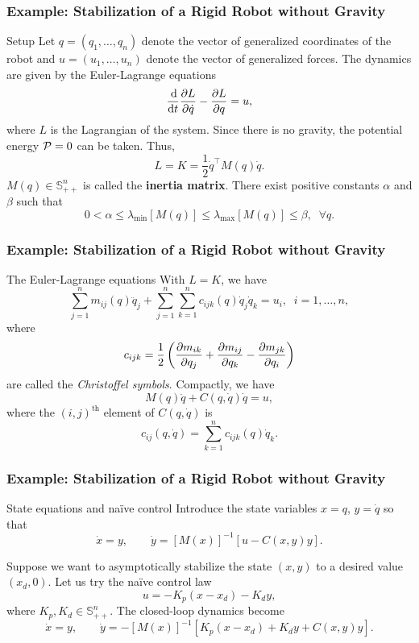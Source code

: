\begin{frame}
    \frametitle{Example: Stabilization of a Rigid Robot without Gravity}

    \begin{block}{Setup}
        Let $q = (q_1, \ldots, q_n)$ denote the vector of generalized
        coordinates of the robot and $u = (u_1, \ldots, u_n)$ denote the vector
        of generalized forces. The dynamics are given by the Euler-Lagrange
        equations \[ \frac{\operatorname{d}\!}{\operatorname{d}\! t} \frac{\partial L}{\partial \dot{q}} - \frac{\partial L}{\partial q} = u, \] where
        $L$ is the Lagrangian of the system. Since there is no gravity, the
        potential energy $\mathcal{P} = 0$ can be taken. Thus, \[ L = K =
        \frac{1}{2}\dot{q}^\top M(q) \dot{q}. \] $M(q) \in \mathbb{S}_{++}^n$ is
        called the \textbf{inertia matrix}. There exist positive constants
        $\alpha$ and $\beta$ such that \[ 0 < \alpha \leq
        \lambda_{\text{min}}\left[M(q)\right] \leq
        \lambda_{\text{max}}\left[M(q)\right] \leq \beta, \;\; \forall q. \]
    \end{block}
\end{frame}

\begin{frame}
    \frametitle{Example: Stabilization of a Rigid Robot without Gravity}

    \begin{block}{The Euler-Lagrange equations}
         With $L=K$, we have \[ \sum_{j=1}^n m_{ij}(q)\ddot{q}_j + \sum_{j=1}^n
         \sum_{k=1}^n c_{ijk}(q) \dot{q}_j \dot{q}_k = u_i, \;\; i = 1, \ldots,
         n, \] where \[ c_{ijk} = \frac{1}{2} \left( \frac{\partial m_{ik}}{\partial q_j} +
         \frac{\partial m_{ij}}{\partial q_k} - \frac{\partial m_{jk}}{\partial q_i} \right) \] are called the
         \textit{Christoffel symbols}. Compactly, we have \[ M(q) \ddot{q} +
         C(q,\dot{q})\dot{q} = u, \] where the $(i,j)^{\text{th}}$ element of
         $C(q,\dot{q})$ is \[ c_{ij}(q,\dot{q}) = \sum_{k=1}^n
         c_{ijk}(q)\dot{q}_k. \]
    \end{block}
\end{frame}


\begin{frame}
    \frametitle{Example: Stabilization of a Rigid Robot without Gravity}

    \begin{block}{State equations and na\"{i}ve control}
        Introduce the state variables $x = q$, $y = \dot{q}$ so that 
        \[ \dot{x} = y, \qquad \dot{y} = \left[ M(x) \right]^{-1} \left[ u -
        C(x,y)y \right]. \]

        Suppose we want to asymptotically stabilize the state $(x,y)$ to a
        desired value $(x_d, 0)$. Let us try the na\"{i}ve control law
        \[ u = -K_p(x - x_d) - K_dy, \] where $K_p, K_d \in \mathbb{S}_{++}^n$.
        The closed-loop dynamics become \[ \dot{x} = y, \qquad \dot{y} = 
        -\left[ M(x) \right]^{-1}\left[ K_p(x-x_d) + K_dy + C(x,y)y \right]. \]
    \end{block}
\end{frame}


